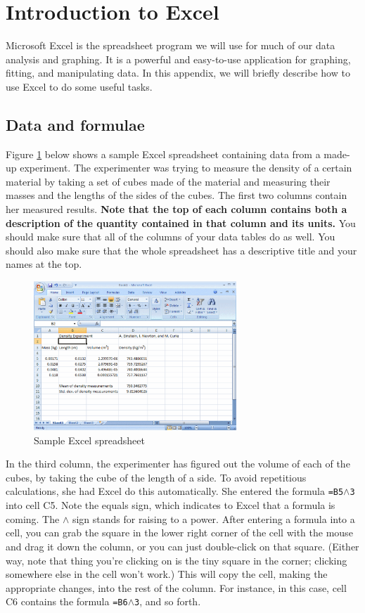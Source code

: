 
\section{Introduction to Excel}

Microsoft Excel is the spreadsheet program we will use for much of our
data analysis and graphing.  It is a powerful and easy-to-use
application for graphing, fitting, and manipulating data. In this
appendix, we will briefly describe how to use Excel to do some useful
tasks.  

\subsection{Data and formulae}

Figure \ref{fig:excel} below shows a sample Excel spreadsheet containing data
from a made-up experiment.  The experimenter was trying to measure
the density of a certain material by taking a set of cubes
made of the material and measuring their masses and the lengths of
the sides of the cubes.  The first two columns contain her measured
results.  \textbf{Note that the top of each column contains both
a description of the quantity contained in that column and its units.}
You should make sure that all of the columns of your data tables do as well.
You should also make sure that the whole spreadsheet has a descriptive
title and your names at the top.

\begin{figure}[b!]
\centerline{\includegraphics[width=3in]{appendices/excelfigs/excelwindow.eps}}
\caption{Sample Excel spreadsheet}
\label{fig:excel}
\end{figure}

In the third column, the experimenter has figured out the volume
of each of the cubes, by taking the cube of the length of a side.
To avoid repetitious calculations, she had Excel do this automatically.
She entered the formula {\tt =B5$\wedge$3}  into cell C5.
Note the equals sign, which indicates to Excel that a formula is coming.
The $\wedge$ sign stands for raising to a power.  After entering a formula
into a cell, you can grab the square in the lower right corner of the
cell with the mouse and drag it down the column, or you can just double-click
on that square.  (Either way, note that thing you're clicking on is
the tiny square in the corner; clicking somewhere else in the cell won't work.)
This will copy
the cell, making the appropriate changes, into the rest of the column.
For instance, in this case, cell C6 contains the formula {\tt =B6$\wedge$3},
and so forth.


